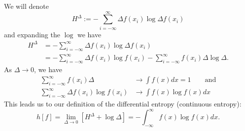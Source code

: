\documentclass[12pt]{article}
\newcommand{\defined}{:=}
\begin{document}
We will denote
\begin{equation}
H^{\Delta} \defined - \sum_{i=-\infty}^{\infty} \Delta f(x_i) \log \Delta f(x_i)
\end{equation}
and expanding the $\log$ we have
\begin{align}
H^{\Delta} &= - \sum_{i=-\infty}^{\infty} \Delta f(x_i) \log \Delta f(x_i)\\
&= - \sum_{i=-\infty}^{\infty} \Delta f(x_i) \log f(x_i) -\sum_{i=-\infty}^{\infty} f(x_i) \Delta \log \Delta.
\end{align}
As $\Delta \to 0$, we have
\begin{align}
\sum_{i=-\infty}^{\infty} f(x_i) \Delta &\to \int f(x) dx = 1\qquad \text{and}\\
\sum_{i=-\infty}^{\infty} \Delta f(x_i) \log f(x_i) &\to \int f(x) \log f(x) dx
\end{align}
This leads us to our definition of the differential entropy (continuous entropy):
\begin{equation}
h[f] = \lim_{\Delta \to 0} \left[H^{\Delta} + \log \Delta\right]  = -\int_{-\infty}^{\infty} f(x) \log f(x) dx.
\end{equation}

\end{document}
